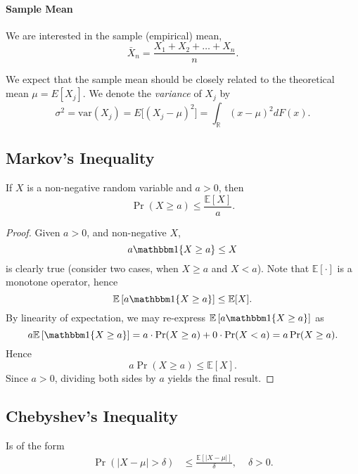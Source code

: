 \documentclass[12pt]{article}\usepackage[]{graphicx}\usepackage[]{color}
\begin{document}
\paragraph{Sample Mean} We are interested in the sample (empirical) mean,
\[
\bar{X}_n = \frac{X_1 + X_2 + \ldots + X_n}{n}.
\]

We expect that the sample mean should be closely related to the theoretical mean $\mu = E[X_j]$. We denote the \emph{variance} of $X_j$ by
\[
\sigma^2 = \textrm{var}(X_j) = E\big[ (X_j - \mu)^2 \big] = \int_{\mathbb R} (x-\mu)^2 d F(x).
\]

\subsection{Markov's Inequality} If $X$ is a non-negative random variable
and $a > 0$, then
\[
\Pr(X \geq a) \leq \frac{\mathbb E[X]}{a}.
\]

\begin{proof}   Given $a > 0$, and non-negative $X$,
  \[
    a \mathbbm 1\{X \geq a\} \leq X
  \]
  is clearly true (consider two cases, when $X \geq a$ and $X < a$).
  Note that $\mathbb E[\cdot]$ is a monotone operator, hence
  \[
    \mathbb E\left[ a \mathbbm 1\{X \geq a\} \right] \leq \mathbb E[X].
  \]
  By linearity of expectation, we may re-express $\mathbb E\left[ a \mathbbm 1\{X \geq a\} \right]$ as
  \[
    a \mathbb E\left[ \mathbbm 1\{X \geq a\} \right] = a \cdot \Pr(X \geq a) + 0 \cdot \Pr(X < a) = a \Pr(X \geq a). 
  \]
  Hence
  \[
    a \Pr(X \geq a) \leq \mathbb E[X].
  \]
  Since $a > 0$, dividing both sides by $a$ yields the final result. \end{proof}

\subsection{Chebyshev's Inequality} Is of the form
\begin{align*}
\Pr(|X-\mu| > \delta) &\leq \frac{\mathbb E \left[ |X - \mu| \right]}{\delta}, \, \, &\delta > 0.
\end{align*}
\end{document}
